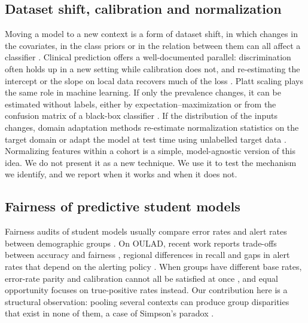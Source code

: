 \documentclass[journal]{IEEEtran}
\begin{document}
\subsection{Dataset shift, calibration and normalization}
Moving a model to a new context is a form of dataset shift, in which changes in the covariates, in the class priors or in the relation between them can all affect a classifier \cite{morenotorres2012shift}. Clinical prediction offers a well-documented parallel: discrimination often holds up in a new setting while calibration does not, and re-estimating the intercept or the slope on local data recovers much of the loss \cite{janssen2008updating,vancalster2019calibration}. Platt scaling \cite{platt1999probabilistic} plays the same role in machine learning. If only the prevalence changes, it can be estimated without labels, either by expectation--maximization \cite{saerens2002priors} or from the confusion matrix of a black-box classifier \cite{lipton2018labelshift}. If the distribution of the inputs changes, domain adaptation methods re-estimate normalization statistics on the target domain \cite{li2018adabn} or adapt the model at test time using unlabelled target data \cite{wang2021tent}. Normalizing features within a cohort is a simple, model-agnostic version of this idea. We do not present it as a new technique. We use it to test the mechanism we identify, and we report when it works and when it does not.

\subsection{Fairness of predictive student models}
Fairness audits of student models usually compare error rates and alert rates between demographic groups \cite{gardner2019slicing,baker2022bias}. On OULAD, recent work reports trade-offs between accuracy and fairness \cite{opoku2025tradeoffs}, regional differences in recall \cite{elsayed2026fairness} and gaps in alert rates that depend on the alerting policy \cite{wu2026calibrated}. When groups have different base rates, error-rate parity and calibration cannot all be satisfied at once \cite{chouldechova2017fair,kleinberg2017tradeoffs}, and equal opportunity \cite{hardt2016equality} focuses on true-positive rates instead. Our contribution here is a structural observation: pooling several contexts can produce group disparities that exist in none of them, a case of Simpson's paradox \cite{simpson1951}.

\end{document}
